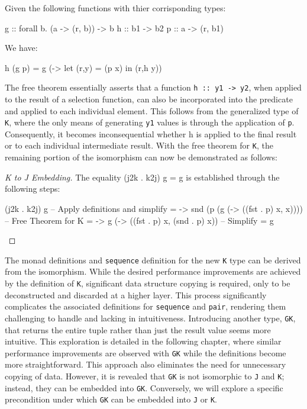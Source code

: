 \documentclass[runningheads]{llncs}
\begin{document}
\begin{theorem}
Given the following functions with thier corrisponding types:

\begin{haskell}
g :: forall b. (a -> (r, b)) -> b
h :: b1 -> b2
p :: a -> (r, b1)
\end{haskell}

We have:

\begin{haskell}
h (g p) = g (\x -> let (r,y) = (p x) in (r,h y))
\end{haskell}

\end{theorem}

The free theorem essentially asserts that a function
\texttt{h\ ::\ y1\ -\textgreater{}\ y2}, when applied to the result of a
selection function, can also be incorporated into the predicate and
applied to each individual element. This follows from the generalized
type of \texttt{K}, where the only means of generating \texttt{y1}
values is through the application of \texttt{p}. Consequently, it
becomes inconsequential whether h is applied to the final result or to
each individual intermediate result. With the free theorem for
\texttt{K}, the remaining portion of the isomorphism can now be
demonstrated as follows:

\begin{proof}[K to J Embedding]
The equality (j2k . k2j) g = g is established through the following steps:

\begin{haskell}
(j2k . k2j) g
-- {{ Apply definitions and simplify}}
= \p -> snd (p (g (\x -> ((fst . p) x, x))))
-- {{ Free Theorem for K }}
= \p -> g (\x -> ((fst . p) x, (snd . p) x))
-- {{ Simplify }}
= g
\end{haskell}

\end{proof}

The monad definitions and \texttt{sequence} definition for the new
\texttt{K} type can be derived from the isomorphism. While the desired
performance improvements are achieved by the definition of \texttt{K},
significant data structure copying is required, only to be deconstructed
and discarded at a higher layer. This process significantly complicates
the associated definitions for \texttt{sequence} and \texttt{pair},
rendering them challenging to handle and lacking in intuitiveness.
Introducing another type, \texttt{GK}, that returns the entire tuple
rather than just the result value seems more intuitive. This exploration
is detailed in the following chapter, where similar performance
improvements are observed with \texttt{GK} while the definitions become
more straightforward. This approach also eliminates the need for
unnecessary copying of data. However, it is revealed that \texttt{GK} is
not isomorphic to \texttt{J} and \texttt{K}; instead, they can be
embedded into \texttt{GK}. Conversely, we will explore a specific
precondition under which \texttt{GK} can be embedded into \texttt{J} or
\texttt{K}.
\end{document}
